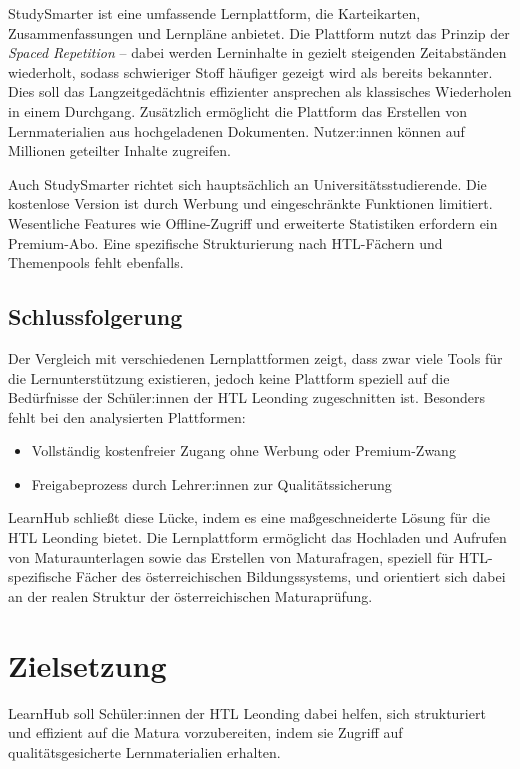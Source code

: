 StudySmarter ist eine umfassende Lernplattform, die Karteikarten,
Zusammenfassungen und Lernpläne anbietet. Die Plattform nutzt das Prinzip
der \textit{Spaced Repetition} -- dabei werden Lerninhalte in gezielt
steigenden Zeitabständen wiederholt, sodass schwieriger Stoff häufiger
gezeigt wird als bereits bekannter. Dies soll das Langzeitgedächtnis
effizienter ansprechen als klassisches Wiederholen in einem Durchgang.
Zusätzlich ermöglicht die Plattform das Erstellen von Lernmaterialien aus
hochgeladenen Dokumenten. Nutzer:innen können auf Millionen geteilter Inhalte
zugreifen.~\cite{studysmarter}
 
Auch StudySmarter richtet sich hauptsächlich an Universitätsstudierende. Die
kostenlose Version ist durch Werbung und eingeschränkte Funktionen limitiert.
Wesentliche Features wie Offline-Zugriff und erweiterte Statistiken erfordern
ein Premium-Abo. Eine spezifische Strukturierung nach HTL-Fächern und
Themenpools fehlt ebenfalls.
 
\subsection{Schlussfolgerung}
Der Vergleich mit verschiedenen Lernplattformen zeigt, dass zwar viele Tools
für die Lernunterstützung existieren, jedoch keine Plattform speziell auf die
Bedürfnisse der Schüler:innen der HTL Leonding zugeschnitten ist. Besonders
fehlt bei den analysierten Plattformen:
 
\begin{itemize}
  \item Vollständig kostenfreier Zugang ohne Werbung oder Premium-Zwang
  \item Freigabeprozess durch Lehrer:innen zur Qualitätssicherung
\end{itemize}
 
LearnHub schließt diese Lücke, indem es eine maßgeschneiderte Lösung für die
HTL Leonding bietet. Die Lernplattform ermöglicht das Hochladen und Aufrufen
von Maturaunterlagen sowie das Erstellen von Maturafragen, speziell für
HTL-spezifische Fächer des österreichischen Bildungssystems, und orientiert
sich dabei an der realen Struktur der österreichischen Maturaprüfung.
 

\section{Zielsetzung}

LearnHub soll Schüler:innen der HTL Leonding dabei helfen, sich strukturiert
und effizient auf die Matura vorzubereiten, indem sie Zugriff auf
qualitätsgesicherte Lernmaterialien erhalten.

